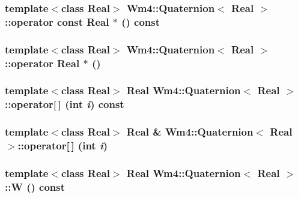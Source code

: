 \subsubsection{\setlength{\rightskip}{0pt plus 5cm}template$<$class Real$>$ {\bf Wm4::Quaternion}$<$ Real $>$::operator const Real $\ast$ () const\hspace{0.3cm}{\tt  [inline]}}\label{classWm4_1_1Quaternion_2f86c976605cbaa01740720ce99a9342}


\subsubsection{\setlength{\rightskip}{0pt plus 5cm}template$<$class Real$>$ {\bf Wm4::Quaternion}$<$ Real $>$::operator Real $\ast$ ()\hspace{0.3cm}{\tt  [inline]}}\label{classWm4_1_1Quaternion_b4eaee550616a96095a0ab0a3ae1f028}


\subsubsection{\setlength{\rightskip}{0pt plus 5cm}template$<$class Real$>$ Real {\bf Wm4::Quaternion}$<$ Real $>$::operator[$\,$] (int {\em i}) const\hspace{0.3cm}{\tt  [inline]}}\label{classWm4_1_1Quaternion_e7561135811553160681730ca0d98670}


\subsubsection{\setlength{\rightskip}{0pt plus 5cm}template$<$class Real$>$ Real \& {\bf Wm4::Quaternion}$<$ Real $>$::operator[$\,$] (int {\em i})\hspace{0.3cm}{\tt  [inline]}}\label{classWm4_1_1Quaternion_50b4a53f03b7d8d84af62bcea70ed713}


\subsubsection{\setlength{\rightskip}{0pt plus 5cm}template$<$class Real$>$ Real {\bf Wm4::Quaternion}$<$ Real $>$::W () const\hspace{0.3cm}{\tt  [inline]}}\label{classWm4_1_1Quaternion_960f989a0ce9d6db3d9906c4d3ad5f1e}


